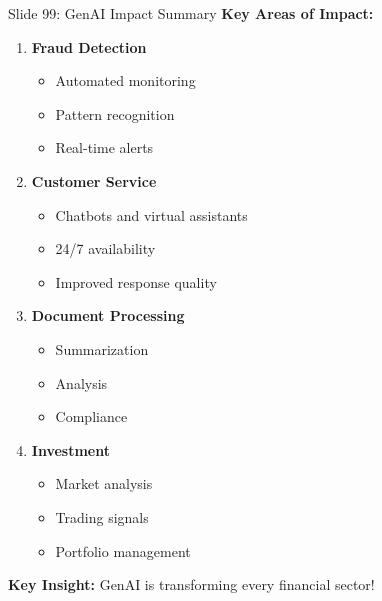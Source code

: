 \documentclass[8pt]{beamer}
\begin{document}
	\begin{frame}{Slide 99: GenAI Impact Summary}
		\fontsize{6.5}{7.5}\selectfont
		\textbf{Key Areas of Impact:}
		\begin{enumerate}
			\item \textbf{Fraud Detection}
			\begin{itemize}
				\item Automated monitoring
				\item Pattern recognition
				\item Real-time alerts
			\end{itemize}
			\item \textbf{Customer Service}
			\begin{itemize}
				\item Chatbots and virtual assistants
				\item 24/7 availability
				\item Improved response quality
			\end{itemize}
			\item \textbf{Document Processing}
			\begin{itemize}
				\item Summarization
				\item Analysis
				\item Compliance
			\end{itemize}
			\item \textbf{Investment}
			\begin{itemize}
				\item Market analysis
				\item Trading signals
				\item Portfolio management
			\end{itemize}
		\end{enumerate}
		
		\textcolor{myblue}{\textbf{Key Insight:}} GenAI is transforming every financial sector!
	\end{frame}
	
\end{document}
